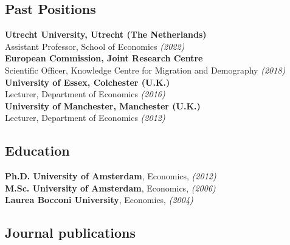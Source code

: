 \documentclass[11pt]{article}
\begin{document}
\subsection*{\sc Past Positions}
\hspace{20pt}\textbf{Utrecht University, Utrecht (The Netherlands)}\\
\hspace*{27pt}Assistant Professor, School of Economics \emph{(2022)}\\
\hspace*{20pt}\textbf{European Commission, Joint Research Centre}\\
\hspace*{27pt}Scientific Officer, Knowledge Centre for Migration and Demography \emph{(2018)}\\
\hspace*{20pt}\textbf{University of Essex, Colchester (U.K.)}\\
\hspace*{27pt}Lecturer, Department of Economics \emph{(2016)}\\
\hspace*{20pt}\textbf{University of Manchester, Manchester (U.K.)}\\
\hspace*{27pt}Lecturer, Department of Economics \emph{(2012)}

\subsection*{\sc Education}

\hspace*{20pt}\textbf{Ph.D. University of Amsterdam}, Economics, \emph{(2012)} \\
\hspace*{20pt}\textbf{M.Sc. University of Amsterdam}, Economics,  \emph{(2006)} \\
\hspace*{20pt}\textbf{Laurea Bocconi University}, Economics, \emph{ (2004)}

\subsection*{\sc Journal publications}

\nocite{keuzenkamp_rijkers_mazza_stapleton_pnas}
\nocite{bicakova_cortes_mazza_eer}
\nocite{mazza_mendola_scipioni_jde}
\nocite{fasani_mazza_jei}
\nocite{mazza_vophem_ee}
\nocite{bcm_le}
\nocite{fasani_mazza-ilrr}
\nocite{christl_et_al-fs}
\nocite{mazza_scipioni_jepp}
\nocite{bicakova_cortes_mazza_ej}
\nocite{mazza_vohpem_hartog_le}
\nocite{mazza_vophem_jrssa}
\end{document}
